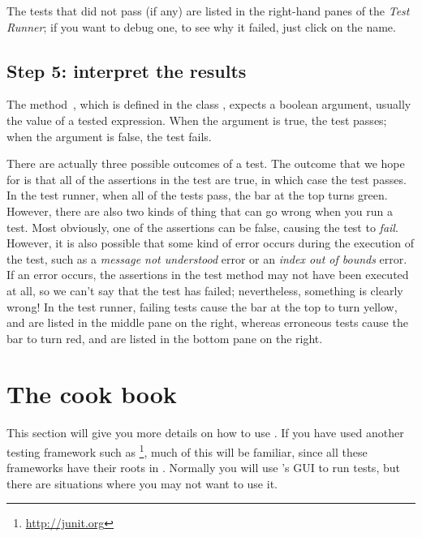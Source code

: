\documentclass[a4paper,10pt,twoside]{book}
\begin{document}

The tests that did not pass (if any) are listed in the right-hand panes of
the \emph{Test Runner};
if you want to debug one, to see why it failed, just click on the name.

\subsection{Step 5: interpret the results}

The method \,, which is defined in the class
, expects a boolean argument, usually the value of a tested expression.  When the argument is
true, the
test passes; when the argument is false, the test fails.

There are actually three possible outcomes of a test.
The outcome that we hope for is that all of the assertions in the test are true, in which case the test passes.
In the test runner, when all of the tests pass, the bar at the top turns green.
However, there are also two kinds of thing that can go wrong when
you run a test.
Most obviously, one of the assertions can be false, causing the test to \emph{fail}.
However, it is also possible that some kind of error occurs during the execution of the test, such as a \emph{message not understood} error or an \emph{index out of bounds} error.
If an error occurs, the assertions in the test method may not have been executed at all,
so we can't say that the test has failed; nevertheless, something is clearly wrong!
In the {test runner}, failing tests cause the bar at the top to turn yellow, and are listed in the middle pane on the right, whereas erroneous tests cause the bar to turn red, and are listed in the bottom pane on the right.


\section{The \SUnit cook book}
This section will give you more details on how to use \SUnit.  If you
have used another testing framework such as \JUnit\footnote{\url{http://junit.org}},
much of this will be familiar, since all these frameworks have their roots in \SUnit.
Normally you will use \SUnit's GUI to run tests, but there are
situations where you may not want to use it.
\end{document}
